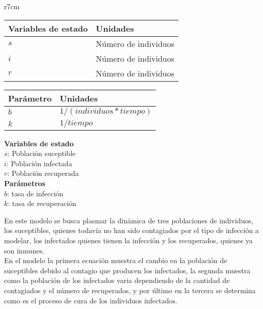 \documentclass{article}
\begin{document}
        \begin{wraptable}[0]{r}{7cm}
            \begin{tabular}{|p{3.5cm} p{3.5cm}|}
                \hline
                Variables de estado & Unidades \\
                \hline
                $s$ & Número de individuos\\
                $i$ & Número de individuos\\
                $r$ & Número de individuos\\
                \hline
            \end{tabular}
            \newline
            \vspace{0.5cm}
            \newline
            \begin{tabular}{|p{2cm} p{5cm}|}
                \hline
                Parámetro & Unidades \\
                \hline
                $b$ & $1/(individuos * tiempo)$\\
                $k$ & $1/tiempo$\\
                \hline
            \end{tabular}
        \end{wraptable}

        \large{\bf{Variables de estado}}\\

        \noindent
        $s$: Población suceptible\\
        $i$: Población infectada\\
        $r$: Población recuperada\\

        \large{\bf{Parámetros}}\\

        \noindent
        $b$: tasa de infección\\
        $k$: tasa de recuperación
        \cite{sir}

        \vspace{1cm}

        En este modelo se busca plasmar la dinámica de tres poblaciones de
        individuos, los suceptibles, quienes todavía no han sido contagiados
        por el tipo de infección a modelar, los infectados quienes tienen la
        infección y los recuperados, quienes ya son inmunes.\\

        En el modelo la primera ecuación muestra el cambio en la población de
        suceptibles debido al contagio que producen los infectados, la
        segunda muestra como la población de los infectados varia
        dependiendo de la cantidad de contagiados y el número de recuperados, y
        por último en la tercera se determina como es el proceso de cura
        de los individuos infectados.
\end{document}
